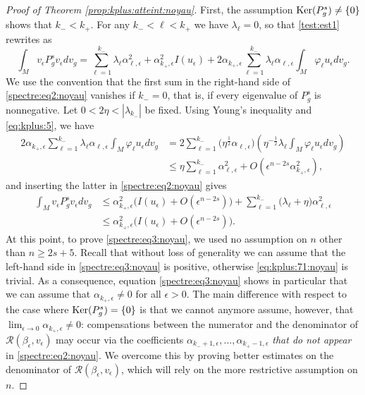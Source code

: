 \documentclass[10pt]{amsart}
\numberwithin{equation}{section}
\def\al{{\alpha}}
\def\la{{\lambda}}
\def\ep{{\varepsilon}}
\def\ker{{\mathop{\rm Ker}}}
\newcommand{\vp}{\varphi}
\def \ep{\epsilon}
\theoremstyle{plain}
\theoremstyle{remark}
\begin{document}
\begin{proof}[Proof of Theorem \ref{prop:kplus:atteint:noyau}]
First, the assumption $\ker(P_g^s)\neq \{0\}$ shows that $k_- < k_{+}$. For any $k_- < \ell < k_+$ we have $\lambda_{\ell}= 0$, so that 
\eqref{test:est1} rewrites as
\begin{equation} \label{spectre:eq2:noyau} 
  \int_{M} v_\ep P_g^s v_\ep dv_g  = \sum_{\ell=1}^{k_-} \lambda_\ell \alpha_{\ell,\ep}^2+ \alpha_{k_+, \ep}^2 I(u_\ep) 
  +2 \alpha_{k_+,\ep}\sum_{\ell=1}^{k_-} \lambda_\ell \alpha_{\ell,\ep} \int_{M} \vp_\ell u_\ep dv_g. 
\end{equation}
We use the convention that the first sum in the right-hand side of \eqref{spectre:eq2:noyau} vanishes if  $k_-=0$, that is, if every eigenvalue of $P_g^s$ is nonnegative. Let $0< 2\eta < | \lambda_{k_-}|$ be fixed. Using Young's inequality and \eqref{eq:kplus:5},   we have 
$$ \begin{aligned}
 2 \alpha_{k_+,\ep}\sum_{\ell=1}^{k_-}  \lambda_\ell \alpha_{\ell,\ep}  \int_{M} \vp_\ell u_\ep dv_g & 
= 2 \sum_{\ell=1}^{k_-} \big(\eta^{\frac{1}{2}} \al_{\ell,\ep} \big) \left( \eta^{-\frac{1}{2}}  \la_{\ell}  \int_{M} \vp_\ell u_\ep dv_g  \right) \\
&\le \eta \sum_{\ell=1}^{k_-} \alpha_{\ell,\ep}^2 + O(\ep^{n-2s} \alpha_{k_+,\ep}^2), 
\end{aligned}  $$ 
and inserting the latter in \eqref{spectre:eq2:noyau} gives 
 \begin{equation} \label{spectre:eq3:noyau} 
\begin{aligned}
  \int_{M} v_\ep P_g^s v_\ep dv_g & \le   \alpha_{k_+, \ep}^2 \Big( I(u_\ep) + O(\ep^{n-2s})\Big) +  \sum_{\ell=1}^{k_-}\big( \lambda_\ell + \eta \big) \alpha_{\ell,\ep}^2\\
  & \le \alpha_{k_+, \ep}^2 \Big( I(u_\ep) + O(\ep^{n-2s})\Big).
\end{aligned} 
\end{equation}
At this point, to prove \eqref{spectre:eq3:noyau}, we used no assumption on $n$ other than $n \ge 2s+5$. Recall that without loss of generality we can assume that the left-hand side in \eqref{spectre:eq3:noyau} is positive, otherwise \eqref{eq:kplus:71:noyau} is trivial. As a consequence, equation \eqref{spectre:eq3:noyau} shows in particular that we can assume that $\alpha_{k_+,\ep} \neq 0$ for all $\ep >0$. The main difference with respect to the case where $\ker(P_g^s) = \{0\}$ is that we cannot anymore assume, however, that $\lim_{\ep \to 0} \alpha_{k_+,\ep} \neq 0$: compensations between the numerator and the denominator of $\mathcal{R}(\beta_\ep, v_\ep)$ may occur via the coefficients  $\alpha_{k_-+1, \ep}, \dots, \alpha_{k_+-1, \ep}$ \emph{that do not appear} in \eqref{spectre:eq2:noyau}. We overcome this by proving better estimates on the denominator of $\mathcal{R}(\beta_\ep, v_\ep)$, which will rely on the more restrictive assumption on $n$. 


\end{proof}
\end{document}
